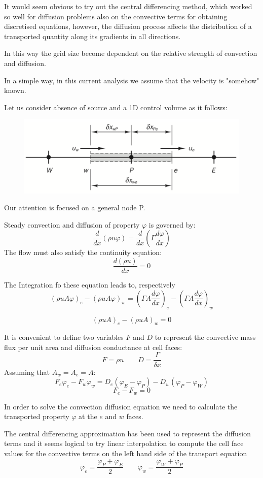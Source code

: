 \documentclass[a4paper, 15pt]{article}
\begin{document}
It
would seem obvious to try out the central differencing method, which worked so well for
diffusion problems also on the convective terms for obtaining discretised equations, however,
the diffusion process affects the distribution of a transported quantity along its
gradients in all directions.  

In this way the grid size become dependent on the relative strength of convection and diffusion. \newline

In a simple way, in this current analysis we assume that the velocity is "somehow" known. \newline 

Let us consider absence of source and a 1D control volume as it follows:
\begin{figure}[H]
	\centering
	\includegraphics[width=0.5\linewidth]{fig/screenshot010}
	\label{fig:screenshot010}
\end{figure}
Our
attention is focused on a general node P. 

Steady convection and diffusion of property $\varphi$ is governed by:
\[\dfrac{d}{dx}(\rho u \varphi) = \dfrac{d}{dx}\left(\Gamma\dfrac{d\varphi}{dx}\right)\]
The
flow must also satisfy the continuity equation:
\[\dfrac{d(\rho u)}{dx} = 0\]

The Integration fo these equation leads to, respectively
\[(\rho uA\varphi)_e - (\rho uA\varphi)_w = \left(\Gamma A\dfrac{d\varphi}{dx}\right)_e - \left(\Gamma A\dfrac{d\varphi}{dx}\right)_w\]

\[(\rho uA)_e - (\rho uA)_w = 0\]

It
is convenient to define two variables $F$ and $D$ to represent the convective mass flux per unit
area and diffusion conductance at cell faces:
\[F = \rho u \qquad D = \dfrac{\Gamma}{\delta x}\]
Assuming that $A_w = A_e = A$:
\[F_e\varphi_e - F_w\varphi_w = D_e(\varphi_E-\varphi_P) - D_w(\varphi_P-\varphi_W) \]
\[F_e - F_w = 0\]

In
order to solve the convection diffusion equation we need to calculate the transported
property $\varphi$ at the $e$ and $w$ faces. \newline 

The
central differencing approximation has been used to represent the diffusion terms and it
seems logical to try linear interpolation to compute the cell face values for the convective terms
on the left hand side of the transport equation
\[\varphi_e = \dfrac{\varphi_P+\varphi_E}{2} \qquad \varphi_w = \dfrac{\varphi_W+\varphi_P}{2}\]
\end{document}
